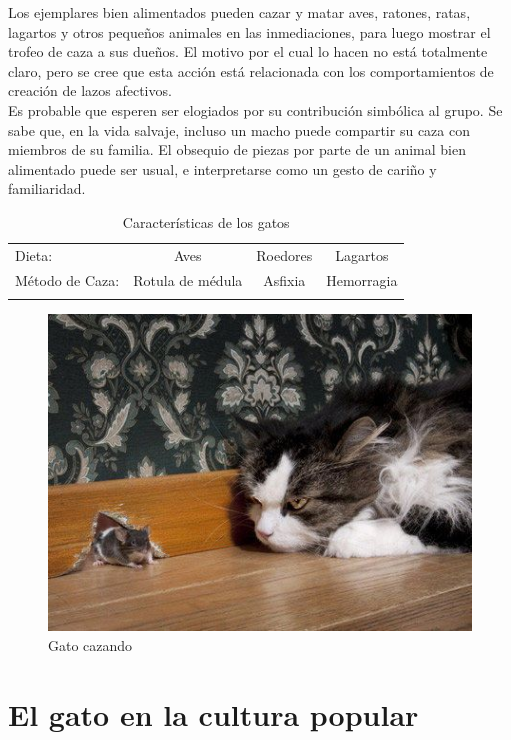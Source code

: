 \documentclass[a4paper]{article}
\begin{document}
Los ejemplares bien alimentados pueden cazar y matar aves, ratones, ratas, lagartos y otros pequeños animales en las inmediaciones, para luego mostrar el trofeo de caza a sus dueños. El motivo por el cual lo hacen no está totalmente claro, pero se cree que esta acción está relacionada con los comportamientos de creación de lazos afectivos. \\

Es probable que esperen ser elogiados por su contribución simbólica al grupo. Se sabe que, en la vida salvaje, incluso un macho puede compartir su caza con miembros de su familia. El obsequio de piezas por parte de un animal bien alimentado puede ser usual, e interpretarse como un gesto de cariño y familiaridad.\\


\begin{table}[htbp]
\center
\caption{Características de los gatos}
\begin{tabular}{lccc}
\hline
Dieta: & Aves & Roedores & Lagartos\\
Método de Caza: & Rotula de médula & Asfixia & Hemorragia\\
\hline
\label{tabla2}
\end{tabular}
\end{table}

\begin{figure}[h!]
\centering
\includegraphics[scale=0.5]{gato3.jpg}
\caption{Gato cazando}
\label{fig:Gato3}
\end{figure}






\pagebreak


\section{El gato en la cultura popular}
\end{document}
